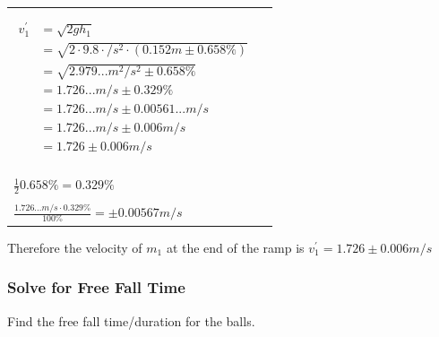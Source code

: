 \documentclass[12pt]{article}
\begin{document}
\begin{center}
\begin{tabular}{l|l}
\makecell{
$\!\begin{aligned}
\cancelto{0}{W_{ext}} + \cancelto{0}{W_{int,\ NC}} &= \triangle{}M_{sys}\\
M_{sys}^{'} &= M_{sys}\\
K_{1}^{'} + \cancelto{0}{U_{1}^{g'}} &= \cancelto{0}{K_{1}} + U_{1}^{g}\\
\frac{\cancel{m_{1}}(v_{1}^{'})^{2}}{2} &= \cancel{m_{1}}gh_{1}
\end{aligned}$\\\\
$\begin{aligned}
v_{1}^{'} &= \sqrt{2gh_{1}}\\
&= \sqrt{2 \cdot{} 9.8\cdot{}/s^2 \cdot{} (0.152m\pm0.658\%)}\\
&= \sqrt{2.979...m^2/s^2\pm0.658\%}\\
&= 1.726...m/s \pm 0.329\%\\
&= 1.726...m/s \pm 0.00561...m/s\\
&= 1.726...m/s \pm 0.006m/s\\
&= 1.726\pm0.006m/s
\end{aligned}$
} &
\makecell{
$\!\begin{aligned}
h_{1} &= 15.2\pm0.1cm\\
&= \frac{15.2cm}{100cm/m} \pm \frac{0.1cm\cdot{}100\%}{15.2cm}\\
&= 0.152m\pm0.658\%
\end{aligned}$\\\\\\\\
$\frac{1}{2} 0.658\% = 0.329\%$\\\\
$\frac{1.726...m/s \cdot{} 0.329\%}{100\%} = \pm0.00567m/s$
}
\end{tabular}
\end{center}

Therefore the velocity of $m_{1}$ at the end of the ramp is $v_{1}^{'} = 1.726\pm0.006m/s$

\pagebreak

\subsubsection{Solve for Free Fall Time}
Find the free fall time/duration for the balls.
\end{document}
